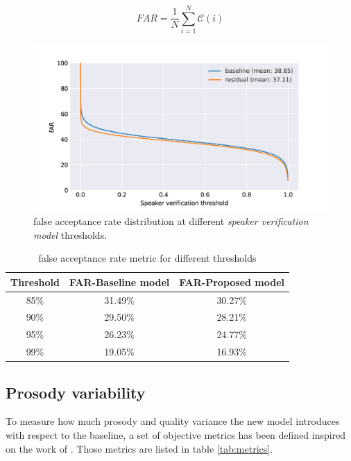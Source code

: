 \begin{equation}
    FAR = \frac{1}{N}\sum_{i=1}^{N} \mathcal{C}(i)
    \label{eq:far}
\end{equation}


\begin{figure}[h]
	\centering
	\includegraphics[width=.7\linewidth]{tts/images/far}
	\caption[False acceptance rates for the TTS models]{false acceptance rate distribution at different \textit{speaker verification model} thresholds.}
	\label{fig:far}
\end{figure}

\begin{table}[h]
	\centering
	\caption[False acceptance rates for different thresholds of the TTS models]{false acceptance rate metric for different thresholds}
	\footnotesize
	\begin{tabular}{ccc}
		\toprule
		\textbf{Threshold} & \textbf{FAR-Baseline model} & \textbf{FAR-Proposed model} \\
		\midrule
		85\% & 31.49\% & 30.27\% \\

		90\% & 29.50\% & 28.21\% \\

		95\% & 26.23\% & 24.77\% \\

		99\% & 19.05\% & 16.93\% \\
		\bottomrule
	\end{tabular}
	\label{tab:far}
\end{table}



\subsection{Prosody variability}
To measure how much prosody and quality variance the new model introduces with respect to the baseline, a set of objective metrics has been defined inspired on the work of \autocite{Raitio2020}. Those metrics are listed in table \ref{tab:metrics}.

